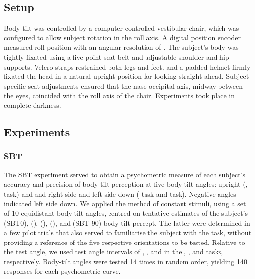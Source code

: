 \subsection{Setup}

Body tilt was controlled by a computer-controlled vestibular chair, which was configured to allow subject rotation in the roll axis. A digital position encoder measured roll position with an angular resolution of . The subject's body was tightly fixated using a five-point seat belt and adjustable shoulder and hip supports. Velcro straps restrained both legs and feet, and a padded helmet firmly fixated the head in a natural upright position for looking straight ahead. Subject-specific seat adjustments ensured that the naso-occipital axis, midway between the eyes, coincided with the roll axis of the chair. Experiments took place in complete darkness. 

\subsection{Experiments}
\label{p1:sec:experiments}

\subsubsection{SBT}
\label{p1:sec:methods_sbt}
 
The SBT experiment served to obtain a psychometric measure of each subject's accuracy and precision of body-tilt perception at five body-tilt angles: upright (,  task) and  and  right side and left side down ( task and  task). Negative angles indicated left side down. We applied the method of constant stimuli, using a set of 10 equidistant body-tilt angles, centred on tentative estimates of the subject's  (SBT0),  (),  (),  (), and  (SBT-90) body-tilt percept. The latter were determined in a few pilot trials that also served to familiarise the subject with the task, without providing a reference of the five respective orientations to be tested. Relative to the test angle, we used test angle intervals of , , and  in the , , and  tasks, respectively. Body-tilt angles were tested 14 times in random order, yielding 140 responses for each psychometric curve. 

